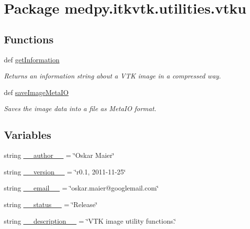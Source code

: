 \hypertarget{namespacemedpy_1_1itkvtk_1_1utilities_1_1vtku}{
\section{Package medpy.itkvtk.utilities.vtku}
\label{namespacemedpy_1_1itkvtk_1_1utilities_1_1vtku}
}
\subsection*{Functions}
\begin{DoxyCompactItemize}
\item 
def \hyperlink{namespacemedpy_1_1itkvtk_1_1utilities_1_1vtku_a68e01014f652814d75f6fa2c821d14da}{getInformation}
\begin{DoxyCompactList}\small\item\em Returns an information string about a VTK image in a compressed way. \end{DoxyCompactList}\item 
def \hyperlink{namespacemedpy_1_1itkvtk_1_1utilities_1_1vtku_af3116b06d846c13483860900d9282229}{saveImageMetaIO}
\begin{DoxyCompactList}\small\item\em Saves the image data into a file as MetaIO format. \end{DoxyCompactList}\end{DoxyCompactItemize}
\subsection*{Variables}
\begin{DoxyCompactItemize}
\item 
string \hyperlink{namespacemedpy_1_1itkvtk_1_1utilities_1_1vtku_af43a92420c5560bc5b4924efc2d4e904}{\_\-\_\-author\_\-\_\-} = \char`\"{}Oskar Maier\char`\"{}
\item 
string \hyperlink{namespacemedpy_1_1itkvtk_1_1utilities_1_1vtku_a20663e6d428a72a84a08920eb1db5b5c}{\_\-\_\-version\_\-\_\-} = \char`\"{}r0.1, 2011-\/11-\/25\char`\"{}
\item 
string \hyperlink{namespacemedpy_1_1itkvtk_1_1utilities_1_1vtku_ab879e23dfd8f5e9972ce9cc5f51b904a}{\_\-\_\-email\_\-\_\-} = \char`\"{}oskar.maier@googlemail.com\char`\"{}
\item 
string \hyperlink{namespacemedpy_1_1itkvtk_1_1utilities_1_1vtku_a543191faf2390964a6904812b265b1c7}{\_\-\_\-status\_\-\_\-} = \char`\"{}Release\char`\"{}
\item 
string \hyperlink{namespacemedpy_1_1itkvtk_1_1utilities_1_1vtku_a0bd69d35b952bfa07aefe2e221bd887f}{\_\-\_\-description\_\-\_\-} = \char`\"{}VTK image utility functions.\char`\"{}
\end{DoxyCompactItemize}


